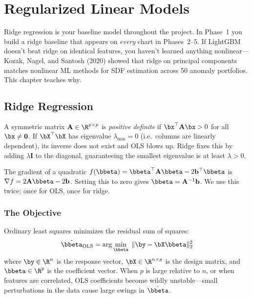 \chapter{Regularized Linear Models}
\label{ch:regularized}

\begin{projectconnection}
Ridge regression is your baseline model throughout the project.
In Phase~1 you build a ridge baseline that appears on \emph{every} chart in Phases~2--5.
If LightGBM doesn't beat ridge on identical features, you haven't learned anything nonlinear---Kozak, Nagel, and Santosh (2020) showed that ridge on principal components matches nonlinear ML methods for SDF estimation across 50 anomaly portfolios.
This chapter teaches why.
\end{projectconnection}

\section{Ridge Regression}
\label{sec:ridge}

\begin{prereq}
A symmetric matrix $\mathbf{A} \in \R^{p \times p}$ is \emph{positive definite} if $\bx^\top \mathbf{A} \bx > 0$ for all $\bx \neq \mathbf{0}$.
If $\bX^\top \bX$ has eigenvalue $\lambda_{\min} = 0$ (i.e.\ columns are linearly dependent), its inverse does not exist and OLS blows up.
Ridge fixes this by adding $\lambda \mathbf{I}$ to the diagonal, guaranteeing the smallest eigenvalue is at least $\lambda > 0$.
\end{prereq}

\begin{prereq}
The gradient of a quadratic $f(\bbeta) = \bbeta^\top \mathbf{A} \bbeta - 2\mathbf{b}^\top \bbeta$ is $\nabla f = 2\mathbf{A}\bbeta - 2\mathbf{b}$.
Setting this to zero gives $\bbeta = \mathbf{A}^{-1}\mathbf{b}$.
We use this twice: once for OLS, once for ridge.
\end{prereq}

\subsection{The Objective}

Ordinary least squares minimizes the residual sum of squares:
\begin{equation}
\hat{\bbeta}_{\mathrm{OLS}} = \arg\min_{\bbeta} \; \| \by - \bX \bbeta \|_2^2
\label{eq:ols-objective}
\end{equation}
where $\by \in \R^n$ is the response vector, $\bX \in \R^{n \times p}$ is the design matrix, and $\bbeta \in \R^p$ is the coefficient vector.
When $p$ is large relative to $n$, or when features are correlated, OLS coefficients become wildly unstable---small perturbations in the data cause large swings in $\hat{\bbeta}$.


